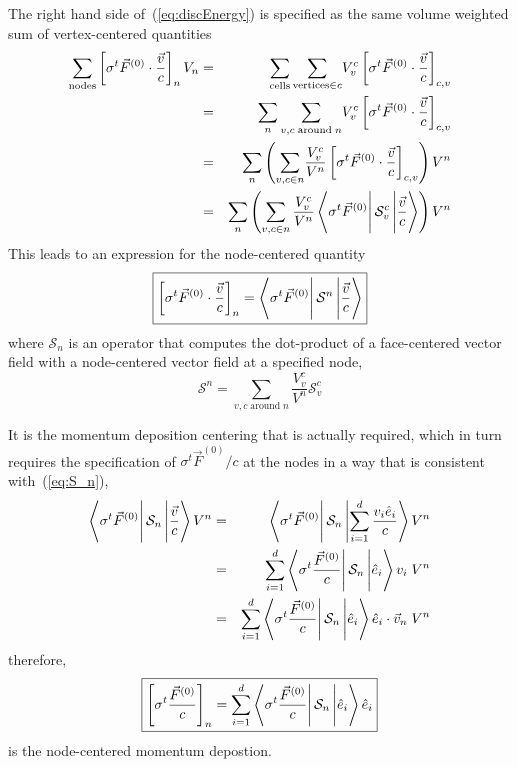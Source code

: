\documentclass{article}
\newcommand{\bracket}[3]{%
  \ensuremath{%
       \left\langle {#1} \rule{0mm}{4ex} \right|%
       {#2} \left| {#3}  \rule{0mm}{4ex} \right\rangle%
  }%
}
\begin{document}
The right hand side of~(\ref{eq:discEnergy}) is specified as 
the same
volume weighted sum of vertex-centered quantities
\begin{eqnarray}
\sum_{\text{nodes}}
      \left[ \sigma^{t} \vec{F}^{(0)} \cdot \frac{\vec{v}}{c} \right]_{n} V_{n}
  &=& \sum_{\text{cells}} 
      \sum_{\text{vertices} \in c} \! V^{c}_{v}
       \left[ \sigma^{t} \vec{F}^{(0)} \cdot \frac{\vec{v}}{c}
        \right]_{c,v} \\
  &=& \sum_{n} 
      \sum_{v,c \;\text{around}\; n} \! V^{c}_{v}
       \left[ \sigma^{t} \vec{F}^{(0)} \cdot \frac{\vec{v}}{c}
        \right]_{c,v} \\
  &=& \sum_{n} \left( 
      \sum_{v,c \in n} \! \frac{V^{c}_{v}}{V^{n}}
       \left[ \sigma^{t} \vec{F}^{(0)} \cdot \frac{\vec{v}}{c}
        \right]_{c,v} \right) V^{n} \\
  &=& \sum_{n} \left( \sum_{ v,c \in n} \frac{V^{c}_{v}}{V^{n}}
	\bracket{\sigma^{t} \vec{F}^{(0)}}
                {\mathcal{S}^{c}_{v}}{\frac{\vec{v}}{c}} \right) V^{n}
\end{eqnarray}
This leads to an expression for the node-centered quantity
\begin{equation}
\boxed{
  \left[ \sigma^{t} \vec{F}^{(0)} \cdot \frac{\vec{v}}{c} \right]_{n}
    = \bracket{\sigma^{t} \vec{F}^{(0)}}{\mathcal{S}^{n}}{\frac{\vec{v}}{c}}
}
\end{equation}
where $\mathcal{S}_{n}$ is an operator that computes the dot-product
of a face-centered vector field with a node-centered vector field at
a specified node,
\begin{equation}
 \boxed{
   \mathcal{S}^{n} = \sum_{ v,c \; \text{around} \; n}
                        \frac{V^{c}_{v}}{V^{n}}\mathcal{S}^{c}_{v}
 }
\label{eq:S_n}
\end{equation}

It is the momentum deposition centering that
is actually required, which in turn requires
the specification of $\sigma^{t} \vec{F}^{(0)} / c$ at the nodes in
a way that
is consistent with~(\ref{eq:S_n}),
\begin{eqnarray}
   \bracket{\sigma^{t} \vec{F}^{(0)}}
                       {\mathcal{S}_{n}}
                       {\frac{\vec{v}}{c}} V^{n}
  &=&  \bracket{\sigma^{t} \vec{F}^{(0)}}
                       {\mathcal{S}_{n}}
                       {\sum_{i=1}^{d} \frac{v_{i}\hat{e}_{i}}{c}} V^{n}
   \\
  &=&  \sum_{i=1}^{d} \bracket{\sigma^{t} \frac{\vec{F}^{(0)}}{c}}
                       {\mathcal{S}_{n}}
                       {\hat{e}_{i}}v_{i} \; V^{n}
   \\
  &=&  \sum_{i=1}^{d} \bracket{\sigma^{t} \frac{\vec{F}^{(0)}}{c}}
                       {\mathcal{S}_{n}}
                       {\hat{e}_{i}} \hat{e}_{i} \cdot \vec{v}_{n}
			 \; V^{n}
\end{eqnarray}
therefore,
\begin{equation}
 \boxed{
\left[ \sigma^{t} \frac{\vec{F}^{(0)}}{c} \right]_{n}
    = \sum_{i=1}^{d} \bracket{\sigma^{t} \frac{\vec{F}^{(0)}}{c}}
                       {\mathcal{S}_{n}}
                       {\hat{e}_{i}} \hat{e}_{i}
}
\end{equation}
is the node-centered momentum depostion.
\end{document}

